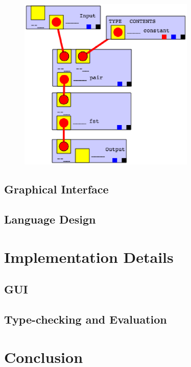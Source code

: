 \documentclass[12pt,UTF8,a4]{article}
\begin{document}
\begin{figure}[h]
\center
\includegraphics[width=0.75\textwidth]{./images/defbody.eps}
\end{figure}

\subsection{Graphical Interface}


\subsection{Language Design}
\section{Implementation Details}
\subsection{GUI}
\subsection{Type-checking and Evaluation}
\section{Conclusion}
\end{document}
